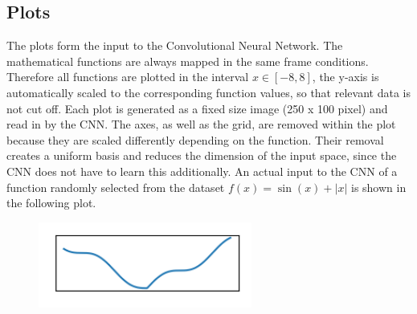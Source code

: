 \documentclass[11pt,a4paper]{scrartcl}
\begin{document}
\subsection{Plots}
The plots form the input to the Convolutional Neural Network. The mathematical functions are always mapped in the same frame conditions. Therefore all functions are plotted in the interval \(x \in [-8,8]\), the y-axis is automatically scaled to the corresponding function values, so that relevant data is not cut off. Each plot is generated as a fixed size image (250 x 100 pixel) and read in by the CNN. The axes, as well as the grid, are removed within the plot because they are scaled differently depending on the function. Their removal creates a uniform basis and reduces the dimension of the input space, since the CNN does not have to learn this additionally. An actual input to the CNN of a function randomly selected from the dataset \(f(x) = \sin(x)+|x|\) is shown in the following plot.
\begin{figure}[h!]
	\centering
	\includegraphics[width=7cm]{function_example}
	\label{img:function_example}
\end{figure}
\end{document}
